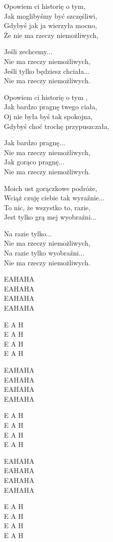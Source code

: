 \begin{text}
    Opowiem ci historię o tym,\\
    Jak moglibyśmy być szczęśliwi,\\
    Gdybyś jak ja wierzyła mocno,\\
    Że nie ma rzeczy niemożliwych,

    Jeśli zechcemy...\\
    Nie ma rzeczy niemożliwych,\\
    Jeśli tylko będziesz chciała...\\
    Nie ma rzeczy niemożliwych.

    Opowiem ci historię o tym ,\\
    Jak bardzo pragnę twego ciała,\\
    Oj nie była byś tak spokojna,\\
    Gdybyś choć trochę przypuszczała,

    Jak bardzo pragnę...\\
    Nie ma rzeczy niemożliwych,\\
    Jak gorąco pragnę...\\
    Nie ma rzeczy niemożliwych.

    Moich ust gorączkowe podróże,\\
    Wciąż czuję ciebie tak wyraźnie...\\
    To nic, że wszystko to, razie,\\
    Jest tylko grą mej wyobraźni...

    Na razie tylko...\\
    Nie ma rzeczy niemożliwych,\\
    Na razie tylko wyobraźni...\\
    Nie ma rzeczy niemożliwych.
\end{text}
\begin{chord}
    EAHAHA\\
    EAHAHA\\
    EAHAHA\\
    EAHAHA

    E A H\\
    E A H\\
    E A H\\
    E A H

    EAHAHA\\
    EAHAHA\\
    EAHAHA\\
    EAHAHA

    E A H\\
    E A H\\
    E A H\\
    E A H

    EAHAHA\\
    EAHAHA\\
    EAHAHA\\
    EAHAHA

    E A H\\
    E A H\\
    E A H\\
    E A H
\end{chord}